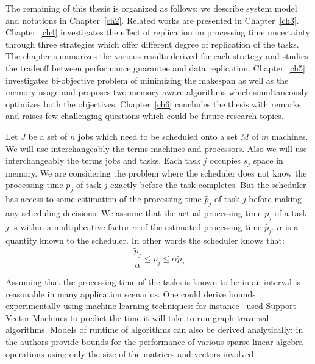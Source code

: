 \documentclass[12pt]{article}
\theoremstyle{mystyle}
\begin{document}
 The remaining of this thesis is organized as follows: we describe system
 model and notations in Chapter~\ref{ch2}. Related works are presented
 in Chapter~\ref{ch3}. Chapter~\ref{ch4} investigates the effect of replication  on processing time uncertainty through three strategies which offer different degree of replication of the tasks. The chapter summarizes the various results derived for each strategy and studies the tradeoff between performance guarantee and data replication. Chapter~\ref{ch5} investigates bi-objective problem of minimizing the makespan as well as the memory usage and proposes two memory-aware algorithms which simultaneously optimizes both the objectives. Chapter~\ref{ch6} concludes the thesis with remarks and raises few challenging questions which could be future research topics. 


\label{ch2}


 Let $J$ be a set of $n$ jobs which need to be scheduled onto a set $M$
 of $m$ machines.  We will use interchangeably the terms machines and
 processors. Also we will use interchangeably the terms jobs and
 tasks. Each task $j$ occupies $s_j$ space in memory.  We are considering the problem where the scheduler does not
 know the processing time $p_j$ of task $j$ exactly before the task
 completes.  But the scheduler has access to some estimation of the
 processing time $\tilde{p_j}$ of task $j$ before making any scheduling
 decisions. We assume that the actual processing time $p_j$ of a task
 $j$ is within a multiplicative factor $\alpha$ of the estimated
 processing time $\tilde{p_j}$. $\alpha$ is a quantity known to the
 scheduler. In other words the scheduler knows that:
  \begin{equation}\label{eq1}
 \frac{\tilde{p}_{j}}{\alpha}\leq p_{j}\leq \alpha \tilde{p}_{j}
 \end{equation}
 
 Assuming that the processing time of the tasks is known to be in an
 interval is reasonable in many application scenarios. One could derive
 bounds experimentally using machine learning techniques: for
 instance~\cite{You14-ICPP} used Support Vector Machines to predict the time it
 will take to run graph traversal algorithms. Models of runtime of
 algorithms can also be derived analytically:
 in~\cite{Erlebacher14-ICS} the authors provide bounds for the
 performance of various sparse linear algebra operations using only the
 size of the matrices and vectors involved.
 
\end{document}

